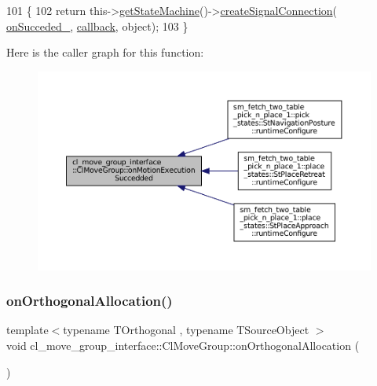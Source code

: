 \begin{DoxyCode}
101   \{
102     \textcolor{keywordflow}{return} this->\hyperlink{classsmacc_1_1ISmaccClient_aec51d4712404cb9882b86e4c854bb93a}{getStateMachine}()->\hyperlink{classsmacc_1_1ISmaccStateMachine_adf0f42ade0c65cc471960fe2a7c42da2}{createSignalConnection}(
      \hyperlink{classcl__move__group__interface_1_1ClMoveGroup_aefc24baaaed9ac7615f4dca20b8a077e}{onSucceded\_}, \hyperlink{sm__ridgeback__barrel__search__1_2servers_2opencv__perception__node_2opencv__perception__node_8cpp_a050e697bd654facce10ea3f6549669b3}{callback}, \textcolor{keywordtype}{object});
103   \}
\end{DoxyCode}
Here is the caller graph for this function\+:
\nopagebreak
\begin{figure}[H]
\begin{center}
\leavevmode
\includegraphics[width=350pt]{classcl__move__group__interface_1_1ClMoveGroup_a6aa372d095e82775a04f41cdcf029cf2_icgraph}
\end{center}
\end{figure}
\mbox{\label{classcl__move__group__interface_1_1ClMoveGroup_a25e248c5a6aaebf543da08eefeca18f0}} 
\subsubsection{\texorpdfstring{on\+Orthogonal\+Allocation()}{onOrthogonalAllocation()}}
{\footnotesize\ttfamily template$<$typename T\+Orthogonal , typename T\+Source\+Object $>$ \\
void cl\+\_\+move\+\_\+group\+\_\+interface\+::\+Cl\+Move\+Group\+::on\+Orthogonal\+Allocation (\begin{DoxyParamCaption}{ }\end{DoxyParamCaption})\hspace{0.3cm}{\ttfamily [inline]}}



